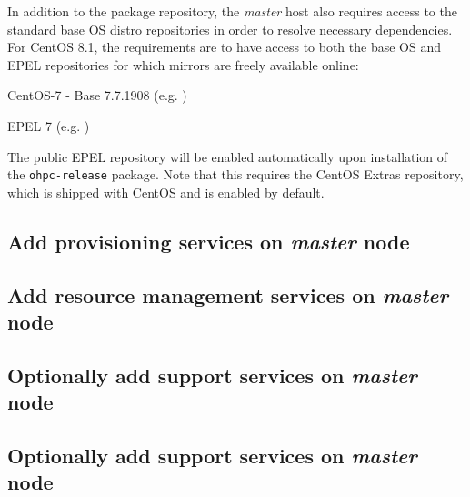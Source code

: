 \documentclass[letterpaper]{article}
\newcommand{\baseOS}{CentOS 8.1}
\begin{document}
In addition to the \OHPC{} package repository, the {\em master} host also
requires access to the standard base OS distro repositories in order to resolve
necessary dependencies. For \baseOS{}, the requirements are to have access to
both the base OS and EPEL repositories for which mirrors are freely available online:

\begin{itemize*}
\item CentOS-7 - Base 7.7.1908
  (e.g. \href{http://mirror.centos.org/centos-7/7/os/x86\_64}
             {\color{blue}{http://mirror.centos.org/centos-7/7/os/x86\_64}} )
\item EPEL 7 (e.g. \href{http://download.fedoraproject.org/pub/epel/7/x86\_64}
                        {\color{blue}{http://download.fedoraproject.org/pub/epel/7/x86\_64}} )
\end{itemize*}

\noindent The public EPEL repository will be enabled automatically upon installation of the 
\texttt{ohpc-release} package. Note that this requires the CentOS Extras
repository, which is shipped with CentOS and is enabled by default.




\subsection{Add provisioning services on {\em master} node} \label{sec:add_provisioning}




\subsection{Add resource management services on {\em master} node} \label{sec:add_rm}


\subsection{Optionally add \InfiniBand{} support services on {\em master} node} \label{sec:add_ofed}


\subsection{Optionally add \OmniPath{} support services on {\em master} node} \label{sec:add_opa}

\end{document}
